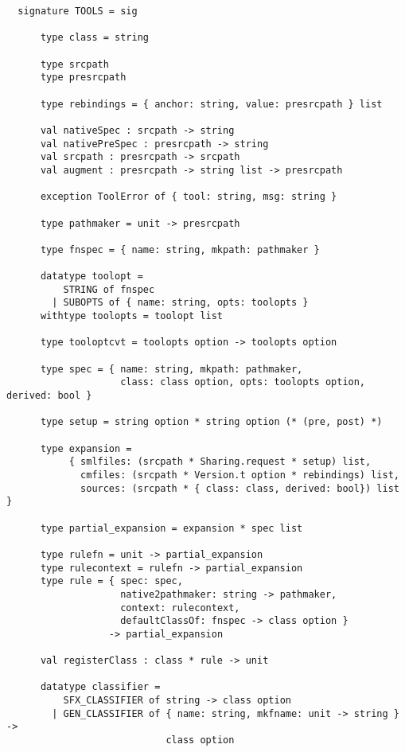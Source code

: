 \begin{small}
\begin{verbatim}
  signature TOOLS = sig
  
      type class = string
  
      type srcpath
      type presrcpath
  
      type rebindings = { anchor: string, value: presrcpath } list
  
      val nativeSpec : srcpath -> string
      val nativePreSpec : presrcpath -> string
      val srcpath : presrcpath -> srcpath
      val augment : presrcpath -> string list -> presrcpath
  
      exception ToolError of { tool: string, msg: string }
  
      type pathmaker = unit -> presrcpath

      type fnspec = { name: string, mkpath: pathmaker }  

      datatype toolopt =
          STRING of fnspec
        | SUBOPTS of { name: string, opts: toolopts }
      withtype toolopts = toolopt list
  
      type tooloptcvt = toolopts option -> toolopts option
  
      type spec = { name: string, mkpath: pathmaker,
                    class: class option, opts: toolopts option, derived: bool }
  
      type setup = string option * string option (* (pre, post) *)
  
      type expansion =
           { smlfiles: (srcpath * Sharing.request * setup) list,
             cmfiles: (srcpath * Version.t option * rebindings) list,
             sources: (srcpath * { class: class, derived: bool}) list }
  
      type partial_expansion = expansion * spec list
  
      type rulefn = unit -> partial_expansion
      type rulecontext = rulefn -> partial_expansion
      type rule = { spec: spec,
                    native2pathmaker: string -> pathmaker,
                    context: rulecontext,
                    defaultClassOf: fnspec -> class option }
                  -> partial_expansion
  
      val registerClass : class * rule -> unit
  
      datatype classifier =
          SFX_CLASSIFIER of string -> class option
        | GEN_CLASSIFIER of { name: string, mkfname: unit -> string } ->
                            class option
  

\end{verbatim}
\end{small}
